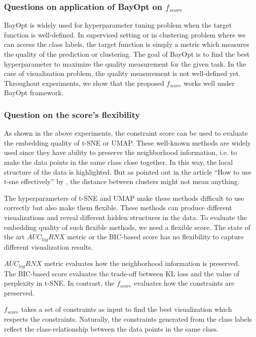\subsubsection*{Questions on application of BayOpt on $f_{score}$}
BayOpt is widely used for hyperparameter tuning problem when the target function is well-defined.
In supervised setting or in clustering problem where we can access the class labels, the target function is simply a metric which measures the quality of the prediction or clustering.
The goal of BayOpt is to find the best hyperparameter to maximize the quality measurement for the given task.
In the case of visualization problem, the quality measurement is not well-defined yet.
Throughout experiments, we show that the proposed $f_{score}$ works well under BayOpt framework.


\subsubsection*{Question on the score's flexibility}

As shown in the above experiments, the constraint score can be used to evaluate the embedding quality of t-SNE or UMAP.
These well-known methods are widely used since they have ability to preserve the neighborhood information, i.e. to make the data points in the same class close together.
In this way, the local structure of the data is highlighted.
But as pointed out in the article ``How to use t-sne effectively'' by \citet{wattenberg2016use}, the distance between clusters might not mean anything.

The hyperparameters of t-SNE and UMAP make these methods difficult to use correctly but also make them flexible.
These methods can produce different visualizations and reveal different hidden structures in the data.
To evaluate the embedding quality of such flexible methods, we need a flexible score.
The state of the art $AUC_{log}RNX$ metric or the BIC-based score has no flexibility to capture different visualization results.

$AUC_{log}RNX$ metric evaluates how the neighborhood information is preserved.
The BIC-based score evaluates the trade-off between KL loss and the value of perplexity in t-SNE.
In contrast, the $f_{score}$ evaluates how the constraints are preserved.

$f_{score}$ takes a set of constraints as input to find the best visualization which respects the constraints.
Naturally, the constraints generated from the class labels reflect the class-relationship between the data points in the same class.



